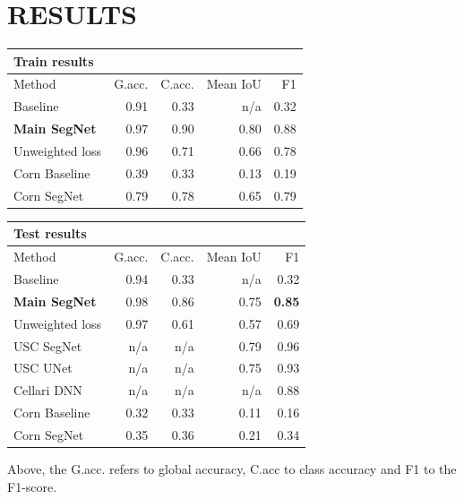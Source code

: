 \documentclass{article}
\begin{document}
\section{RESULTS}
\label{sec:illust}

\begin{table}[!htb]
	\centering
	\begin{tabular}{l r r r r}
		\textbf{Train results} & & & & \\
		\toprule
		Method  &  G.acc.  &  C.acc.  &  Mean IoU  &  F1 \\ \midrule
		Baseline  &  0.91  &  0.33  &  n/a  &  0.32 \\
		\textbf{Main SegNet}  &  0.97  &  0.90  &  0.80  &  0.88 \\
		Unweighted loss   &  0.96  &  0.71  &  0.66  &  0.78 \\
		\midrule 
		Corn Baseline  &  0.39  &  0.33  &  0.13  &  0.19 \\
		Corn SegNet  &  0.79  &  0.78  &  0.65  &  0.79 \\
		\bottomrule
	\end{tabular}
\end{table}

\begin{table}[!htb]
	\centering
	\begin{tabular}{l r r r r}
		\textbf{Test results} & & & & \\
		\toprule
		Method  &  G.acc.  &  C.acc.  &  Mean IoU  &  F1 \\ \midrule
		Baseline  &  0.94  &  0.33  &  n/a  &  0.32 \\
		\textbf{Main SegNet}  &  0.98  &  0.86  &  0.75  & \textbf{ 0.85} \\
		Unweighted loss  &  0.97  &  0.61  &  0.57  &  0.69 \\
		\midrule
		USC SegNet  &  n/a  &  n/a  &  0.79  &  0.96 \\
		USC UNet  &  n/a  &  n/a  &  0.75  &  0.93 \\
		Cellari DNN  &  n/a  &  n/a  &  n/a  &  0.88 \\
		\midrule 
		Corn Baseline  &  0.32  &  0.33  &  0.11  &  0.16 \\
		Corn SegNet   &  0.35  &  0.36  &  0.21  &  0.34 \\
		\bottomrule
	\end{tabular}
\end{table}
\noindent Above, the G.acc. refers to global accuracy, C.acc to class accuracy and F1 to the F1-score.
\end{document}
